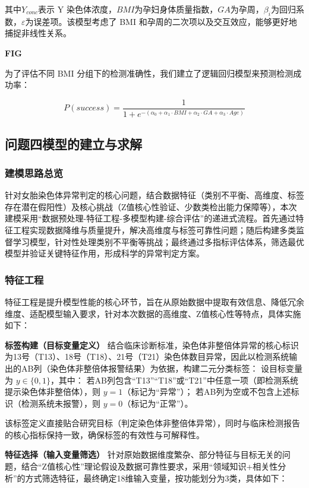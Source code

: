 \documentclass[withoutpreface,bwprint]{cumcmthesis} %
\begin{document}
其中$Y_{conc}$表示 Y 染色体浓度，$BMI$为孕妇身体质量指数，$GA$为孕周，$\beta_i$为回归系数，$\varepsilon$为误差项。该模型考虑了 BMI 和孕周的二次项以及交互效应，能够更好地捕捉非线性关系。

\textbf{FIG}

为了评估不同 BMI 分组下的检测准确性，我们建立了逻辑回归模型来预测检测成功率：

$$P(success) = \frac{1}{1 + e^{-(\alpha_0 + \alpha_1 \cdot BMI + \alpha_2 \cdot GA + \alpha_3 \cdot Age)}}$$

\subsection{问题四模型的建立与求解}
\subsubsection{建模思路总览}
针对女胎染色体异常判定的核心问题，结合数据特征（类别不平衡、高维度、标签存在潜在假阳性）及核心挑战（Z值核心性验证、少数类检出能力保障等），本次建模采用“数据预处理-特征工程-多模型构建-综合评估”的递进式流程。首先通过特征工程实现数据降维与质量提升，解决高维度与标签可靠性问题；随后构建多类监督学习模型，针对性处理类别不平衡等挑战；最终通过多指标评估体系，筛选最优模型并验证关键特征作用，形成科学的异常判定方案。


\subsubsection{特征工程}
特征工程是提升模型性能的核心环节，旨在从原始数据中提取有效信息、降低冗余维度、适配模型输入要求，针对本次数据的高维度、Z值核心性等特点，具体实施如下：

\textbf{标签构建（目标变量定义）}
结合临床诊断标准，染色体非整倍体异常的核心标识为13号（T13）、18号（T18）、21号（T21）染色体数目异常，因此以检测系统输出的AB列（染色体非整倍体报警结果）为依据，构建二元分类标签：  
设目标变量为 $ y \in \{0,1\} $，其中：  
若AB列包含“T13”“T18”或“T21”中任意一项（即检测系统提示染色体非整倍体），则 $ y=1 $（标记为“异常”）；  
若AB列为空或不包含上述标识（检测系统未报警），则 $ y=0 $（标记为“正常”）。  

该标签定义直接贴合研究目标（判定染色体非整倍体异常），同时与临床检测报告的核心指标保持一致，确保标签的有效性与可解释性。

\textbf{特征选择（输入变量筛选）}
针对原始数据维度繁杂、部分特征与目标无关的问题，结合“Z值核心性”理论假设及数据可靠性要求，采用“领域知识+相关性分析”的方式筛选特征，最终确定18维输入变量，按功能划分为3类，具体如下：  
\end{document}
